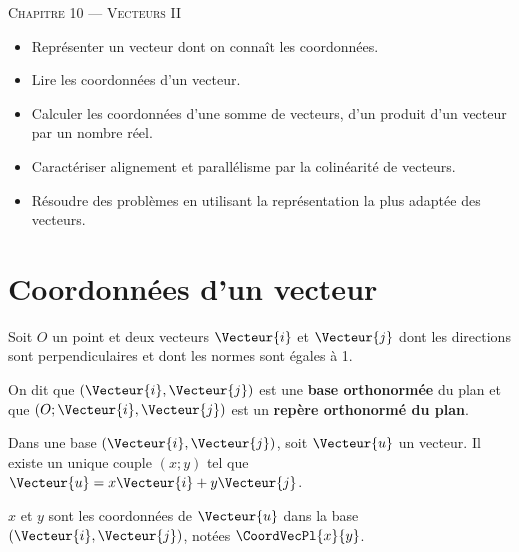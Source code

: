 \documentclass[a4paper]{article}
\begin{document}
\begin{center}
  {\scshape\LARGE Chapitre 10 --- Vecteurs II\par}
\end{center}

\begin{savoirfaire}{}{}
    \begin{itemize}[label=$\square$]
        \item Représenter un vecteur dont on conna\^it les coordonnées.
        \item Lire les coordonnées d’un vecteur.
        \item Calculer les coordonnées d’une somme de vecteurs, d’un produit d’un vecteur par un nombre réel.
        \item Caractériser alignement et parallélisme par la colinéarité de vecteurs.
        \item Résoudre des problèmes en utilisant la représentation la plus adaptée des vecteurs.
    \end{itemize}
\end{savoirfaire}


\section{Coordonnées d'un vecteur}
\begin{definition}{}{}
  Soit $O$ un point et deux vecteurs $\Vecteur{i}$ et $\Vecteur{j}$ dont les directions sont 
  perpendiculaires et dont les normes sont égales à 1.

  On dit que $(\Vecteur{i},\Vecteur{j})$ est une \textbf{base orthonormée} du plan 
  et que $(O;\Vecteur{i},\Vecteur{j})$ est un \textbf{repère orthonormé du plan}.
\end{definition}

\begin{definition}{}{}
  Dans une base $(\Vecteur{i},\Vecteur{j})$, soit $\Vecteur{u}$ un vecteur. Il existe un unique couple $(x;y)$ tel que $\Vecteur{u}=x\Vecteur{i}+y\Vecteur{j}$.


  $x$ et $y$ sont les coordonnées de $\Vecteur{u}$ dans la base $(\Vecteur{i},\Vecteur{j})$, 
  notées $\CoordVecPl{x}{y}$.
\end{definition}
\end{document}
